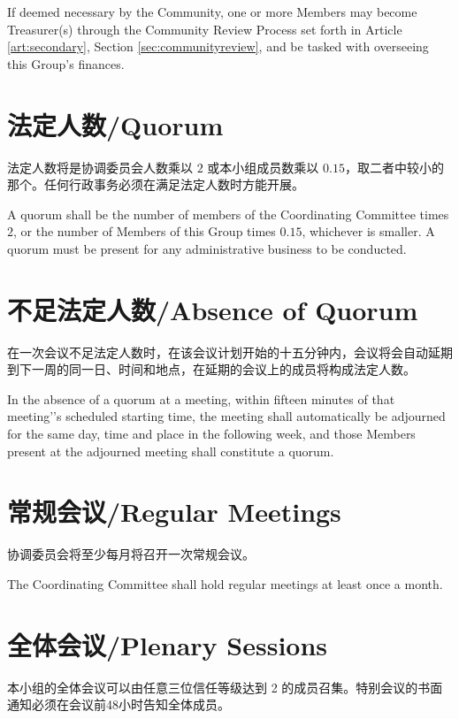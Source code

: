 \documentclass[12pt]{aspasia-constitution}
\begin{document}
	If deemed necessary by the Community, one or more Members may become Treasurer(s) through the Community Review Process set forth in Article \ref{art:secondary}, Section \ref{sec:communityreview}, and be tasked with overseeing this Group's finances.
	
	 \label{art:meetings}
	
	\section{法定人数/Quorum} \label{sec:quorum}
	
	法定人数将是协调委员会人数乘以 $2$ 或本小组成员数乘以 $0.15$，取二者中较小的那个。任何行政事务必须在满足法定人数时方能开展。
	
	A quorum shall be the number of members of the Coordinating Committee times $2$, or the number of Members of this Group times $0.15$, whichever is smaller. A quorum must be present for any administrative business to be conducted.
	
	\section{不足法定人数/Absence of Quorum} \label{sec:noquorum}
	
	在一次会议不足法定人数时，在该会议计划开始的十五分钟内，会议将会自动延期到下一周的同一日、时间和地点，在延期的会议上的成员将构成法定人数。
	
	In the absence of a quorum at a meeting, within fifteen minutes of that meeting'’s scheduled starting time, the meeting shall automatically be adjourned for the same day,
	time and place in the following week, and those Members present at the adjourned meeting shall constitute a quorum.
	
	\section{常规会议/Regular Meetings} \label{sec:regularmeeting}
	
	协调委员会将至少每月将召开一次常规会议。
	
	The Coordinating Committee shall hold regular meetings at least once a month.
	
	\section{全体会议/Plenary Sessions} \label{sec:plenarysessions}
	
	本小组的全体会议可以由任意三位信任等级达到 2 的成员召集。特别会议的书面通知必须在会议前48小时告知全体成员。
	
\end{document}
